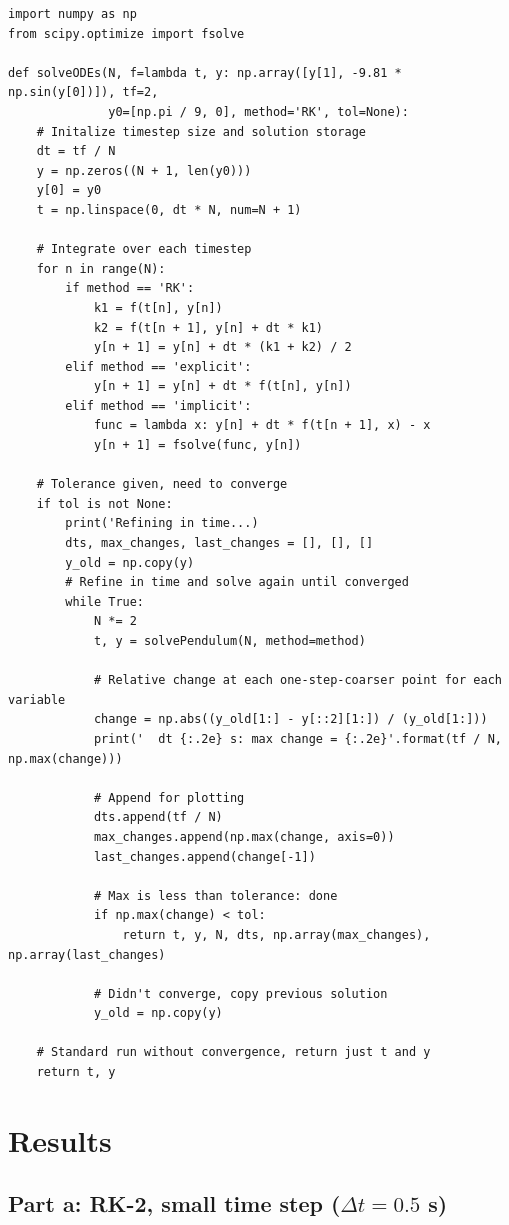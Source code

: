 \documentclass{article}
\begin{document}
\begin{verbatim}
import numpy as np
from scipy.optimize import fsolve

def solveODEs(N, f=lambda t, y: np.array([y[1], -9.81 * np.sin(y[0])]), tf=2,
              y0=[np.pi / 9, 0], method='RK', tol=None):
    # Initalize timestep size and solution storage
    dt = tf / N
    y = np.zeros((N + 1, len(y0)))
    y[0] = y0
    t = np.linspace(0, dt * N, num=N + 1)

    # Integrate over each timestep
    for n in range(N):
        if method == 'RK':
            k1 = f(t[n], y[n])
            k2 = f(t[n + 1], y[n] + dt * k1)
            y[n + 1] = y[n] + dt * (k1 + k2) / 2
        elif method == 'explicit':
            y[n + 1] = y[n] + dt * f(t[n], y[n])
        elif method == 'implicit':
            func = lambda x: y[n] + dt * f(t[n + 1], x) - x
            y[n + 1] = fsolve(func, y[n])

    # Tolerance given, need to converge
    if tol is not None:
    	print('Refining in time...)
        dts, max_changes, last_changes = [], [], []
        y_old = np.copy(y)
        # Refine in time and solve again until converged
        while True:
            N *= 2
            t, y = solvePendulum(N, method=method)

            # Relative change at each one-step-coarser point for each variable
            change = np.abs((y_old[1:] - y[::2][1:]) / (y_old[1:]))
            print('  dt {:.2e} s: max change = {:.2e}'.format(tf / N, np.max(change)))

            # Append for plotting
            dts.append(tf / N)
            max_changes.append(np.max(change, axis=0))
            last_changes.append(change[-1])

            # Max is less than tolerance: done
            if np.max(change) < tol:
                return t, y, N, dts, np.array(max_changes), np.array(last_changes)

            # Didn't converge, copy previous solution
            y_old = np.copy(y)

    # Standard run without convergence, return just t and y
    return t, y
\end{verbatim}

\section*{Results}

\subsection*{Part a: RK-2, small time step ($\Delta t = 0.5$ s)}
\end{document}
